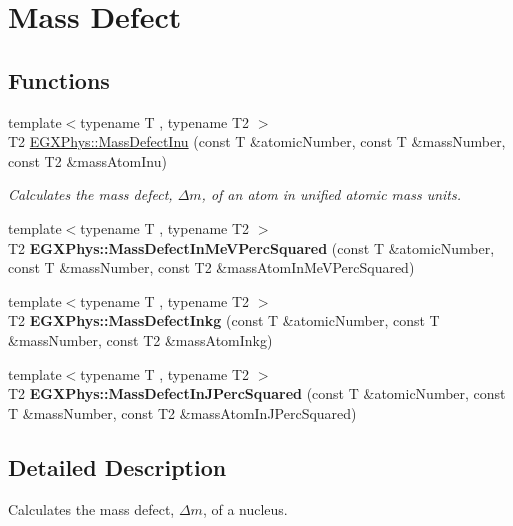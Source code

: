 \hypertarget{group___mass_defect}{}\section{Mass Defect}
\label{group___mass_defect}
\subsection*{Functions}
\begin{DoxyCompactItemize}
\item 
{\footnotesize template$<$typename T , typename T2 $>$ }\\T2 \hyperlink{group___mass_defect_ga70400004a5cb622de372ab84670731ef}{E\+G\+X\+Phys\+::\+Mass\+Defect\+Inu} (const T \&atomic\+Number, const T \&mass\+Number, const T2 \&mass\+Atom\+Inu)
\begin{DoxyCompactList}\small\item\em Calculates the mass defect, $\Delta m$, of an atom in unified atomic mass units. \end{DoxyCompactList}\item 
\mbox{\label{group___mass_defect_gab51169bf871d0ea0ee0642fa300228fe}} 
{\footnotesize template$<$typename T , typename T2 $>$ }\\T2 {\bfseries E\+G\+X\+Phys\+::\+Mass\+Defect\+In\+Me\+V\+Perc\+Squared} (const T \&atomic\+Number, const T \&mass\+Number, const T2 \&mass\+Atom\+In\+Me\+V\+Perc\+Squared)
\item 
\mbox{\label{group___mass_defect_gad5378933021e13598a76bd8581b1e887}} 
{\footnotesize template$<$typename T , typename T2 $>$ }\\T2 {\bfseries E\+G\+X\+Phys\+::\+Mass\+Defect\+Inkg} (const T \&atomic\+Number, const T \&mass\+Number, const T2 \&mass\+Atom\+Inkg)
\item 
\mbox{\label{group___mass_defect_ga08cff1dfa3259af8f1b67ec741796e91}} 
{\footnotesize template$<$typename T , typename T2 $>$ }\\T2 {\bfseries E\+G\+X\+Phys\+::\+Mass\+Defect\+In\+J\+Perc\+Squared} (const T \&atomic\+Number, const T \&mass\+Number, const T2 \&mass\+Atom\+In\+J\+Perc\+Squared)
\end{DoxyCompactItemize}


\subsection{Detailed Description}
Calculates the mass defect, $\Delta m$, of a nucleus. 


